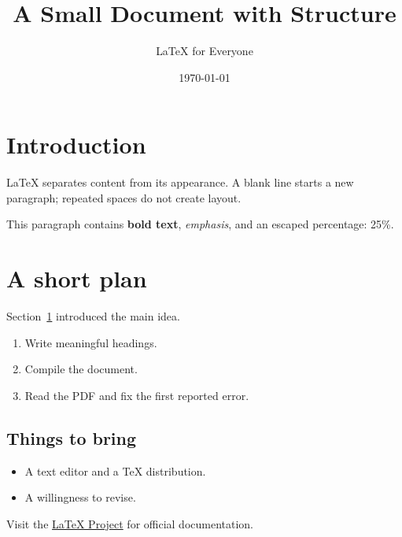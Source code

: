 \documentclass[11pt]{article}
\title{A Small Document with Structure}
\author{LaTeX for Everyone}
\date{\today}
\newcommand{\toolname}{LaTeX}
\begin{document}
\maketitle

\section{Introduction}
\label{sec:introduction}
\toolname{} separates content from its appearance. A blank line starts
a new paragraph; repeated spaces do not create layout.

This paragraph contains \textbf{bold text}, \emph{emphasis}, and an
escaped percentage: 25\%.

\section{A short plan}
Section~\ref{sec:introduction} introduced the main idea.
\begin{enumerate}
  \item Write meaningful headings.
  \item Compile the document.
  \item Read the PDF and fix the first reported error.
\end{enumerate}

\subsection{Things to bring}
\begin{itemize}
  \item A text editor and a TeX distribution.
  \item A willingness to revise.
\end{itemize}

Visit the \href{https://www.latex-project.org/}{LaTeX Project}
for official documentation.
\end{document}
